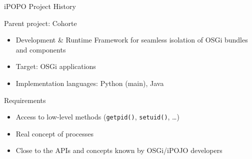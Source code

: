 \begin{frame}{iPOPO Project History}
\begin{block}{Parent project: Cohorte}
\begin{itemize}
\item Development \& Runtime Framework for seamless isolation of OSGi bundles and components
\item Target: OSGi applications
\item Implementation languages: Python (main), Java
\end{itemize}
\end{block}

\begin{block}{Requirements}
\begin{itemize}
\item Access to low-level methods (\texttt{getpid()}, \texttt{setuid()}, \ldots)
\item Real concept of processes
\item Close to the APIs and concepts known by OSGi/iPOJO developers
\end{itemize}
\end{block}
\end{frame}

